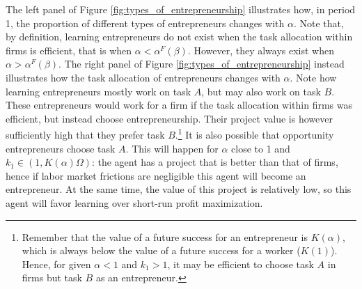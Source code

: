 \documentclass[12pt,american]{paper}
\theoremstyle{remark}
\begin{document}
The left panel of Figure \ref{fig:types_of_entrepreneurship} illustrates how, in period 1, the proportion of different types of entrepreneurs changes with $\alpha$. Note that, by definition, learning entrepreneurs do not exist when the task allocation within firms is efficient, that is when $\alpha<\alpha^F(\beta)$. However, they always exist when  $\alpha>\alpha^F(\beta)$. The right panel of Figure \ref{fig:types_of_entrepreneurship} instead illustrates how the task allocation of entrepreneurs changes with $\alpha$. Note how learning entrepreneurs mostly work on task $A$, but may also work on task $B$. These entrepreneurs would work for a firm if the task allocation within firms was efficient, but instead choose entrepreneurship. Their project value is however sufficiently high that they prefer task $B$.\footnote{Remember that the value of a future success for an entrepreneur is $K(\alpha)$, which is always below the value of a future success for a worker ($K(1)$). Hence, for given $\alpha<1$ and $k_1>1$, it may be efficient to choose task $A$ in firms but task $B$ as an entrepreneur.} It is also possible that opportunity entrepreneurs choose task $A$. This will happen for $\alpha$ close to 1 and $k_1\in(1,K(\alpha)\Omega)$: the agent has a project that is better than that of firms, hence if labor market frictions are negligible this agent will become an entrepreneur. At the same time, the value of this project is relatively low, so this agent will favor learning over short-run profit maximization.  
\end{document}
